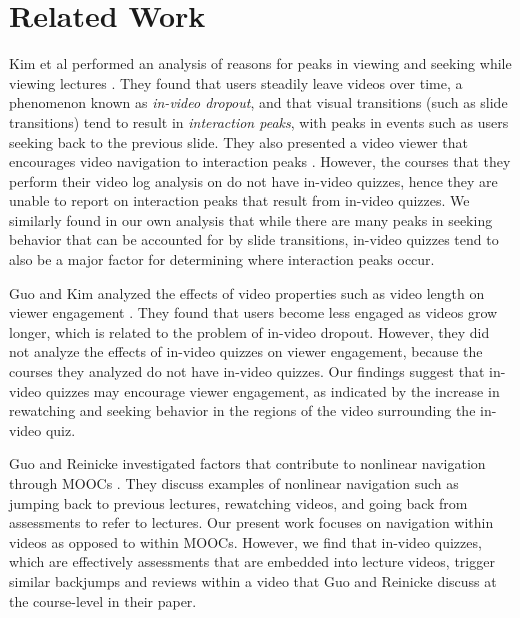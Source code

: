 \documentclass{sigchi}
\begin{document}
\newpage

\section{Related Work}

Kim et al performed an analysis of reasons for peaks in viewing and seeking while viewing lectures \cite{juho}. They found that users steadily leave videos over time, a phenomenon known as \emph{in-video dropout}, and that visual transitions (such as slide transitions) tend to result in \emph{interaction peaks}, with peaks in events such as users seeking back to the previous slide. They also presented a video viewer that encourages video navigation to interaction peaks  \cite{juho2}. However, the courses that they perform their video log analysis on do not have in-video quizzes, hence they are unable to report on interaction peaks that result from in-video quizzes. We similarly found in our own analysis that while there are many peaks in seeking behavior that can be accounted for by slide transitions, in-video quizzes tend to also be a major factor for determining where interaction peaks occur. %

Guo and Kim analyzed the effects of video properties such as video length on viewer engagement \cite{guovideo}. They found that users become less engaged as videos grow longer, which is related to the problem of in-video dropout. However, they did not analyze the effects of in-video quizzes on viewer engagement, because the courses they analyzed do not have in-video quizzes. Our findings suggest that in-video quizzes may encourage viewer engagement, as indicated by the increase in rewatching and seeking behavior in the regions of the video surrounding the in-video quiz. %

Guo and Reinicke investigated factors that contribute to nonlinear navigation through MOOCs \cite{guodemographics}. They discuss examples of nonlinear navigation such as jumping back to previous lectures, rewatching videos, and going back from assessments to refer to lectures. Our present work focuses on navigation within videos as opposed to within MOOCs. However, we find that in-video quizzes, which are effectively assessments that are embedded into lecture videos, trigger similar backjumps and reviews within a video that Guo and Reinicke discuss at the course-level in their paper.
\end{document}
